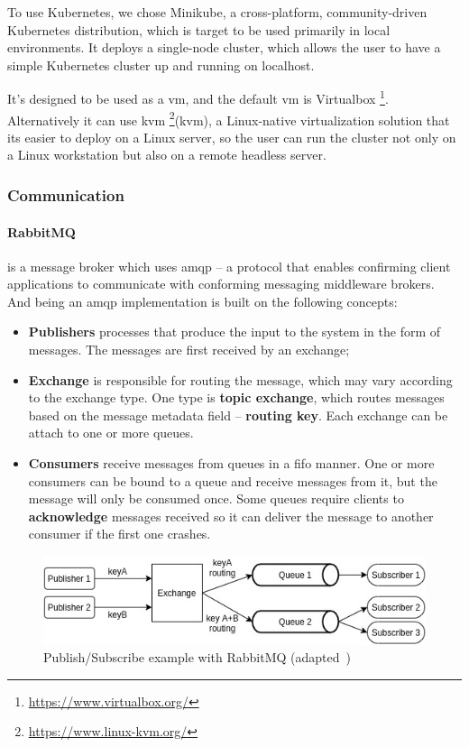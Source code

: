 To use Kubernetes, we chose Minikube, a cross-platform, community-driven Kubernetes distribution, which is target to be used primarily in local environments. It deploys a single-node cluster, which allows the user to have a simple Kubernetes cluster up and running on localhost. 

It's designed to be used as a \acrshort{vm}, and the default \acrshort{vm} is Virtualbox \footnote{\url{https://www.virtualbox.org/}}. Alternatively it can use \acrlong{kvm} \footnote{\url{https://www.linux-kvm.org/}}(\acrshort{kvm}), a Linux-native virtualization solution that its easier to deploy on a Linux server, so the user can run the cluster not only on a Linux workstation but also on a remote headless server.

\subsubsection{Communication}
\label{sss:backend-communication}


\paragraph{\textbf{RabbitMQ}} is a message broker which uses \acrfull{amqp} -- a protocol that enables confirming client applications to communicate with conforming messaging middleware brokers. And being an \acrshort{amqp} implementation is built on the following concepts:

\begin{itemize}
    \item \textbf{Publishers} processes that produce the input to the system in the form of messages. The messages are first received by an exchange;
    \item \textbf{Exchange} is responsible for routing the message, which may vary according to the exchange type. One type is \textbf{topic exchange}, which routes messages based on the message metadata field -- \textbf{routing key}. Each exchange can be attach to one or more queues. 
    \item \textbf{Consumers} receive messages from queues in a \acrfull{fifo} manner. One or more consumers can be bound to a queue and receive messages from it, but the message will only be consumed once. Some queues require clients to \textbf{acknowledge} messages received so it can deliver the message to another consumer if the first one crashes.
\end{itemize}

\begin{figure}[h]
    \centering
    \includegraphics[width=1\textwidth,clip,trim=0 0 0 5]{Chapters/img/2_background/RabbitMQ.jpg}
    \caption{Publish/Subscribe example with RabbitMQ (adapted~\cite{rabbit-mq-pub-sub})} 
    \label{fig:rabbit-pubsub}
\end{figure}

